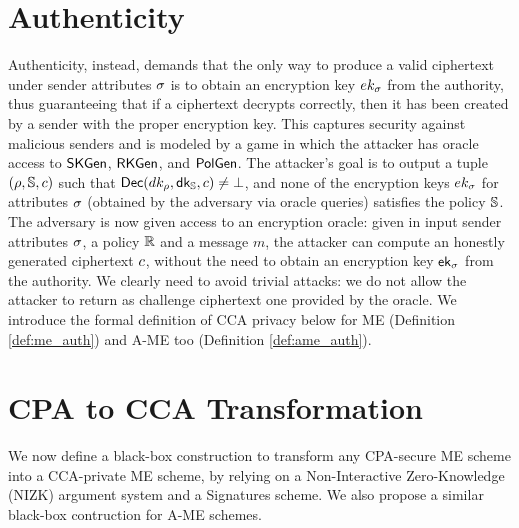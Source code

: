 \section{Authenticity}\label{sec:cca-auth}
Authenticity, instead, demands that the only way to produce a valid ciphertext under sender attributes $\sigma$ is to obtain an encryption key $ek_\sigma$ from the authority, thus guaranteeing that if a ciphertext decrypts correctly, then it has been created by a sender with the proper encryption key. This captures security against malicious senders and is modeled by a game in which the attacker has oracle access to $\mathsf{SKGen}$, $\mathsf{RKGen}$, and $\mathsf{PolGen}$.
The attacker's goal is to output a tuple $(\rho, \mathbb{S}, c)$ such that $\mathsf{Dec}(dk_\rho, \mathsf{dk}_{\mathbb{S}}, c) \not= \bot$, and none of the encryption keys $ek_\sigma$ for attributes $\sigma$ (obtained by the adversary via oracle queries) satisfies the policy $\mathbb{S}$.
\newline\newline
The adversary is now given access to an encryption oracle: given in input sender attributes $\sigma$, a policy $\mathbb{R}$ and a message $m$, the attacker can compute an honestly generated ciphertext $c$, without the need to obtain an encryption key $\mathsf{ek}_\sigma$ from the authority.
We clearly need to avoid trivial attacks: we do not allow the attacker to return as challenge ciphertext one provided by the oracle.
We introduce the formal definition of CCA privacy below for ME (Definition \ref{def:me_auth}) and A-ME too (Definition \ref{def:ame_auth}).




\section{CPA to CCA Transformation}\label{sec:cca-transformation}
We now define a black-box construction to transform any CPA-secure ME scheme into a CCA-private ME scheme, by relying on a Non-Interactive Zero-Knowledge (NIZK) argument system and a Signatures scheme.
We also propose a similar black-box contruction for A-ME schemes.



